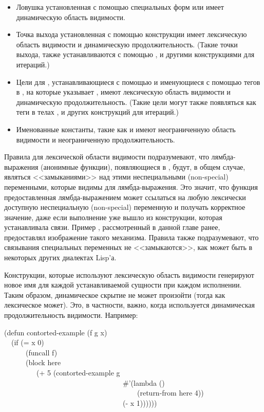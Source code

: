\begin{itemize}

\item Ловушка установленная с помощью специальных форм  или
   имеет динамическую область видимости.

\item
Точка выхода установленная с помощью конструкции  имеет лексическую
область видимости и динамическую продолжительность. (Такие точки выхода, также
устанавливаются с помощью ,  и другими конструкциями для итераций.)

\item
Цели для , устанавливающиеся с помощью  и именующиеся с
помощью тегов в , на которые указывает , имеют лексическую
область видимости и динамическую продолжительность. (Такие  цели могут
также появляться как теги в телах ,  и других конструкций для итераций.)

\item
Именованные константы, такие как  и  имеют неограниченную область
видимости и неограниченную продолжительность.
\end{itemize}

Правила для лексической области видимости подразумевают, что лямбда-выражения
(анонимные функции), появляющиеся в , будут, в общем случае,
являться <<замыканиями>> над этими неспециальными (non-special) переменными,
которые видимы для лямбда-выражения.
Это значит, что функция предоставленная лямбда-выражением может ссылаться на
любую лексически доступную неспециальную (non-special) переменную и получать
корректное значение, даже если выполнение уже вышло из конструкции, которая
устанавливала связи.
Пример , рассмотренный в данной главе ранее, предоставлял
изображение такого механизма.
Правила также подразумевают, что связывания специальных переменных не
<<замыкаются>>, как может быть в некоторых других диалектах Lisp'а.

Конструкции, которые используют лексическую область видимости генерируют новое имя
для каждой устанавливаемой сущности при каждом исполнении.
Таким образом, динамическое скрытие не может произойти (тогда как лексическое
может).
Это, в частности, важно, когда используется динамическая продолжительность
видимости.
Например:

\begin{lisp}
(defun contorted-example (f g x) \\
~~(if (= x 0) \\
~~~~~~(funcall f) \\
~~~~~~(block here \\
~~~~~~~~~(+ 5 (contorted-example g \\
~~~~~~~~~~~~~~~~~~~~~~~~~~~~~~~~~\#'(lambda () \\
~~~~~~~~~~~~~~~~~~~~~~~~~~~~~~~~~~~~~(return-from here 4)) \\
~~~~~~~~~~~~~~~~~~~~~~~~~~~~~~~~~(- x 1))))))
\end{lisp}

